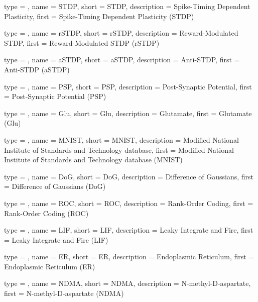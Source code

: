 {
	type        = \acronymtype,
	name        = {STDP},
	short       = {STDP},
	description = {Spike-Timing Dependent Plasticity},
	first       = {Spike-Timing Dependent Plasticity (STDP)}
}

{
	type        = \acronymtype,
	name        = {rSTDP},
	short       = {rSTDP},
	description = {Reward-Modulated STDP},
	first       = {Reward-Modulated STDP (rSTDP)}
}

{
	type        = \acronymtype,
	name        = {aSTDP},
	short       = {aSTDP},
	description = {Anti-STDP},
	first       = {Anti-STDP (aSTDP)}
}

{
	type        = \acronymtype,
	name        = {PSP},
	short       = {PSP},
	description = {Post-Synaptic Potential},
	first       = {Post-Synaptic Potential (PSP)}
}

{
	type        = \acronymtype,
	name        = {Glu},
	short       = {Glu},
	description = {Glutamate},
	first       = {Glutamate (Glu)}
}

{
	type        = \acronymtype,
	name        = {MNIST},
	short       = {MNIST},
	description = {Modified National Institute of Standards and Technology database},
	first       = {Modified National Institute of Standards and Technology database (MNIST)}
}

{
	type        = \acronymtype,
	name        = {DoG},
	short       = {DoG},
	description = {Difference of Gaussians},
	first       = {Difference of Gaussians (DoG)}
}

{
	type        = \acronymtype,
	name        = {ROC},
	short       = {ROC},
	description = {Rank-Order Coding},
	first       = {Rank-Order Coding (ROC)}
}

{
	type        = \acronymtype,
	name        = {LIF},
	short       = {LIF},
	description = {Leaky Integrate and Fire},
	first       = {Leaky Integrate and Fire (LIF)}
}

{
	type        = \acronymtype,
	name        = {ER},
	short       = {ER},
	description = {Endoplasmic Reticulum},
	first       = {Endoplasmic Reticulum (ER)}
}

{
	type        = \acronymtype,
	name        = {NDMA},
	short       = {NDMA},
	description = {N-methyl-D-aspartate},
	first       = {N-methyl-D-aspartate (NDMA)}
}



